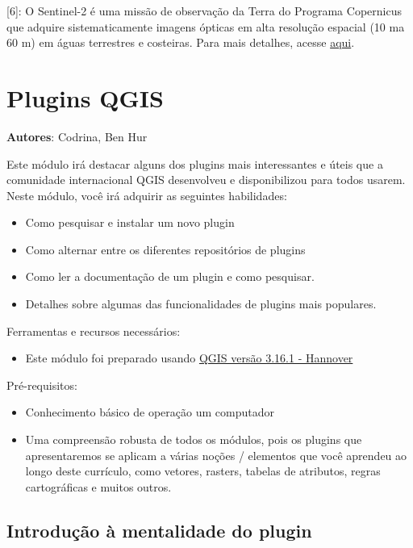 \documentclass[
]{krantz}
\providecommand{\tightlist}{%
  \setlength{\itemsep}{0pt}\setlength{\parskip}{0pt}}
\begin{document}
{[}6{]}: O Sentinel-2 é uma missão de observação da Terra do Programa Copernicus que adquire sistematicamente imagens ópticas em alta resolução espacial (10 ma 60 m) em águas terrestres e costeiras. Para mais detalhes, acesse \href{https://sentinel.esa.int/web/sentinel/missions/sentinel-2}{aqui}.

\hypertarget{plugins-qgis}{%
\chapter{Plugins QGIS}\label{plugins-qgis}}

\textbf{Autores}: Codrina, Ben Hur

Este módulo irá destacar alguns dos plugins mais interessantes e úteis que a comunidade internacional QGIS desenvolveu e disponibilizou para todos usarem. Neste módulo, você irá adquirir as seguintes habilidades:

\begin{itemize}
\tightlist
\item
  Como pesquisar e instalar um novo plugin
\item
  Como alternar entre os diferentes repositórios de plugins
\item
  Como ler a documentação de um plugin e como pesquisar.
\item
  Detalhes sobre algumas das funcionalidades de plugins mais populares.
\end{itemize}

Ferramentas e recursos necessários:

\begin{itemize}
\tightlist
\item
  Este módulo foi preparado usando \href{https://qgis.org/en/site/forusers/download.html}{QGIS versão 3.16.1 - Hannover}
\end{itemize}

Pré-requisitos:

\begin{itemize}
\tightlist
\item
  Conhecimento básico de operação um computador
\item
  Uma compreensão robusta de todos os módulos, pois os plugins que apresentaremos se aplicam a várias noções / elementos que você aprendeu ao longo deste currículo, como vetores, rasters, tabelas de atributos, regras cartográficas e muitos outros.
\end{itemize}

\hypertarget{introduuxe7uxe3o-uxe0-mentalidade-do-plugin}{%
\section{Introdução à mentalidade do plugin}\label{introduuxe7uxe3o-uxe0-mentalidade-do-plugin}}
\end{document}
